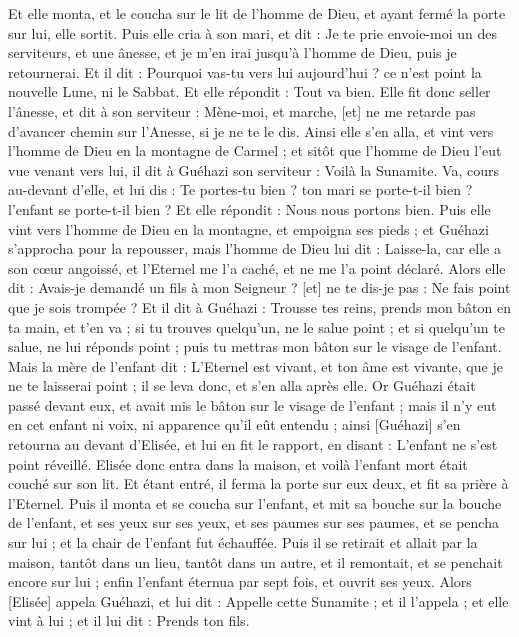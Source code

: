 \begin{multicols}{2}
Et elle monta, et le coucha sur le lit de l'homme de Dieu, et ayant fermé la porte sur lui, elle sortit.
Puis elle cria à son mari, et dit : Je te prie envoie-moi un des serviteurs, et une ânesse, et je m'en irai jusqu'à l'homme de Dieu, puis je retournerai.
Et il dit : Pourquoi vas-tu vers lui aujourd'hui ? ce n'est point la nouvelle Lune, ni le Sabbat. Et elle répondit : Tout va bien.
Elle fit donc seller l'ânesse, et dit à son serviteur : Mène-moi, et marche, [et] ne me retarde pas d'avancer chemin sur l'Anesse, si je ne te le dis.
Ainsi elle s'en alla, et vint vers l'homme de Dieu en la montagne de Carmel ; et sitôt que l'homme de Dieu l'eut vue venant vers lui, il dit à Guéhazi son serviteur : Voilà la Sunamite.
Va, cours au-devant d'elle, et lui dis : Te portes-tu bien ? ton mari se porte-t-il bien ? l'enfant se porte-t-il bien ? Et elle répondit : Nous nous portons bien.
Puis elle vint vers l'homme de Dieu en la montagne, et empoigna ses pieds ; et Guéhazi s'approcha pour la repousser, mais l'homme de Dieu lui dit : Laisse-la, car elle a son cœur angoissé, et l'Eternel me l'a caché, et ne me l'a point déclaré.
Alors elle dit : Avais-je demandé un fils à mon Seigneur ? [et] ne te dis-je pas : Ne fais point que je sois trompée ?
Et il dit à Guéhazi : Trousse tes reins, prends mon bâton en ta main, et t'en va ; si tu trouves quelqu'un, ne le salue point ; et si quelqu'un te salue, ne lui réponds point ; puis tu mettras mon bâton sur le visage de l'enfant.
Mais la mère de l'enfant dit : L'Eternel est vivant, et ton âme est vivante, que je ne te laisserai point ; il se leva donc, et s'en alla après elle.
Or Guéhazi était passé devant eux, et avait mis le bâton sur le visage de l'enfant ; mais il n'y eut en cet enfant ni voix, ni apparence qu'il eût entendu ; ainsi [Guéhazi] s'en retourna au devant d'Elisée, et lui en fit le rapport, en disant : L'enfant ne s'est point réveillé.
Elisée donc entra dans la maison, et voilà l'enfant mort était couché sur son lit.
Et étant entré, il ferma la porte sur eux deux, et fit sa prière à l'Eternel.
Puis il monta et se coucha sur l'enfant, et mit sa bouche sur la bouche de l'enfant, et ses yeux sur ses yeux, et ses paumes sur ses paumes, et se pencha sur lui ; et la chair de l'enfant fut échauffée.
Puis il se retirait et allait par la maison, tantôt dans un lieu, tantôt dans un autre, et il remontait, et se penchait encore sur lui ; enfin l'enfant éternua par sept fois, et ouvrit ses yeux.
Alors [Elisée] appela Guéhazi, et lui dit : Appelle cette Sunamite ; et il l'appela ; et elle vint à lui ; et il lui dit : Prends ton fils.

\end{multicols}
